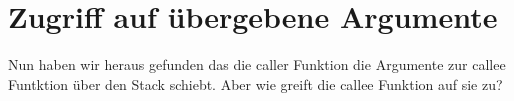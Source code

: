 \section{Zugriff auf übergebene Argumente}
\myindex{\Stack}

Nun haben wir heraus gefunden das die \gls{caller} Funktion die Argumente zur \gls{callee} Funtktion über
den Stack schiebt.
Aber wie greift die \gls{callee} Funktion auf sie zu?









